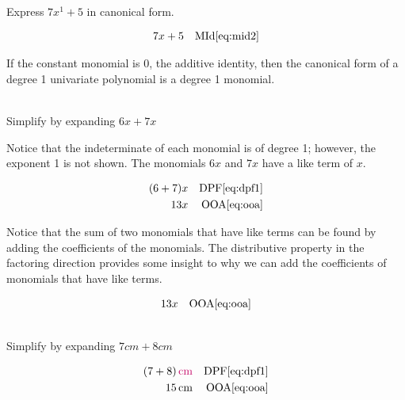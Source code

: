 \documentclass[20150903-160354-rs2.2-MarksMathNotebook.tex]{subfiles}
\begin{document}
\begin{example}[id:20141121-093439] \label{20141121-093439} \hfill \\

Express $7x^1+5$ in canonical form.

\soln

\solnsteps
\begin{align*}
7x+5 && \text{MId} \eqref{eq:mid2} \\
\end{align*}
\end{example}

If the constant monomial is 0, the additive identity, then the canonical form of a degree 1 univariate polynomial is a degree 1 monomial.

\begin{example}[id:20141120-203846] \label{20141120-203846} \hfill \\

Simplify by expanding $6x+7x$

\soln

\solnsteps

Notice that the indeterminate of each monomial is of degree 1; however, the exponent 1 is not shown.  The monomials $6x$ and $7x$ have a like term of $x$.

\begin{align*}
(6+7)x && \text{DPF} \eqref{eq:dpf1} \\
13x && \text{OOA} \eqref{eq:ooa}
\end{align*}

Notice that the sum of two monomials that have like terms can be found by adding the coefficients of the monomials.  The distributive property in the factoring direction provides some insight to why we can add the coefficients of monomials that have like terms.\\

\soln

\lesssteps
\begin{align*}
13x && \text{OOA} \eqref{eq:ooa}
\end{align*}

\end{example}

\begin{example}[id:20141027-075159]\label{20141027-075159} \hfill \\

Simplify by expanding $7\unit{cm}+8\unit{cm}$

\soln

\solnsteps
\begin{align*}
(7+8)\alert{\unit{cm}}  &&\text{DPF}\eqref{eq:dpf1} \\
15\unit{cm}  &&\text{OOA} \eqref{eq:ooa}
\end{align*}
\end{example}
\end{document}
